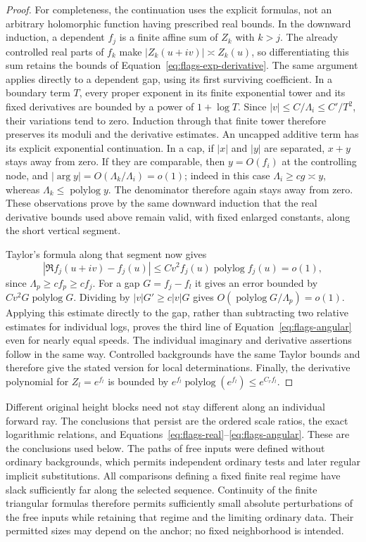 \begin{proof}
For completeness, the continuation uses the explicit formulas, not
an arbitrary holomorphic function having prescribed real bounds.
In the downward induction, a dependent $f_j$ is a finite affine sum
of $Z_k$ with $k>j$. The already controlled real parts of $f_k$
make $|Z_k(u+iv)|\asymp Z_k(u)$, so differentiating this sum
retains the bounds of Equation~\eqref{eq:flags-exp-derivative}.
The same argument applies directly to a dependent gap, using its
first surviving coefficient. In a boundary term $T$, every proper
exponent in its finite exponential tower and its fixed derivatives
are bounded by a power of $1+\log T$. Since
$|v|\le C/\Lambda_i\le C'/T^2$, their variations tend to zero.
Induction through that finite tower therefore preserves its moduli
and the derivative estimates. An uncapped additive term has its
explicit exponential continuation.
In a cap, if $|x|$ and $|y|$ are separated, $x+y$ stays away from
zero. If they are comparable, then $y=O(f_i)$ at the controlling
node, and
$|\arg y|=O(\Lambda_k/\Lambda_i)=o(1)$; indeed in this case
$\Lambda_i\ge cg\asymp y$, whereas
$\Lambda_k\le\operatorname{polylog}y$.
The denominator therefore again stays away from zero. These
observations prove by the same downward induction that the real
derivative bounds used above remain valid, with fixed enlarged
constants, along the short vertical segment.

Taylor's formula along that segment now gives
\[
 |\Re f_j(u+iv)-f_j(u)|
 \le C v^2 f_j(u)\operatorname{polylog}f_j(u)=o(1),
\]
since $\Lambda_p\ge cf_p\ge cf_j$. For a gap $G=f_j-f_l$
it gives an error bounded by
$Cv^2G\operatorname{polylog}G$. Dividing by
$|v|G'\ge c|v|G$ gives
$O(\operatorname{polylog}G/\Lambda_p)=o(1)$.
Applying this estimate directly to the gap, rather than subtracting
two relative estimates for individual logs, proves the third line
of Equation~\eqref{eq:flags-angular} even for nearly equal speeds.
The individual imaginary and derivative assertions follow in the
same way. Controlled backgrounds have the same Taylor bounds and
therefore give the stated version for local determinations. Finally,
the derivative polynomial for $Z_l=e^{f_l}$ is bounded by
$e^{f_l}\operatorname{polylog}(e^{f_l})\le e^{C_rf_l}$.
\end{proof}

\begin{remark}\label{rem:flags-path-heights}
Different original height blocks need not stay different along an
individual forward ray. The conclusions that persist are the ordered
scale ratios, the exact logarithmic relations, and
Equations~\eqref{eq:flags-real}--\eqref{eq:flags-angular}. These
are the conclusions used below. The paths of free inputs were defined
without ordinary backgrounds, which permits independent ordinary
tests and later regular implicit substitutions.
All comparisons defining a fixed finite real regime have slack
sufficiently far along the selected sequence. Continuity of the
finite triangular formulas therefore permits sufficiently small
absolute perturbations of the free inputs while retaining that
regime and the limiting ordinary data. Their permitted sizes may
depend on the anchor; no fixed neighborhood is intended.
\end{remark}

